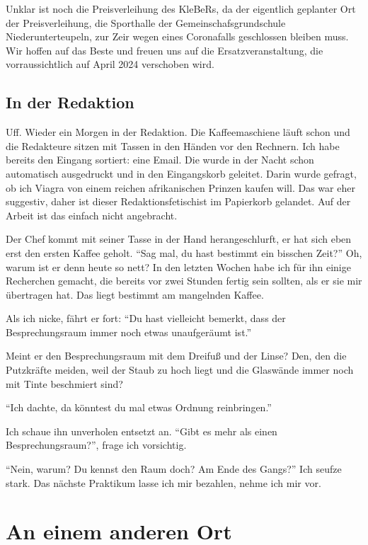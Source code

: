 \documentclass[final]{multiversum}
\begin{document}
Unklar ist noch die Preisverleihung des KleBeRs, da der eigentlich geplanter Ort der Preisverleihung, die Sporthalle der Gemeinschafsgrundschule Niederunterteupeln, zur Zeir wegen eines Coronafalls geschlossen bleiben muss.
Wir hoffen auf das Beste und freuen uns auf die Ersatzveranstaltung, die vorraussichtlich auf April 2024 verschoben wird.

\subsection{In der Redaktion}
Uff. Wieder ein Morgen in der Redaktion.
Die Kaffeemaschiene läuft schon und die Redakteure sitzen mit Tassen in den Händen vor den Rechnern.
Ich habe bereits den Eingang sortiert: eine Email.
Die wurde in der Nacht schon automatisch ausgedruckt und in den Eingangskorb geleitet.
Darin wurde gefragt, ob ich Viagra von einem reichen afrikanischen Prinzen kaufen will.
Das war eher suggestiv, daher ist dieser Redaktionsfetischist im Papierkorb gelandet.
Auf der Arbeit ist das einfach nicht angebracht.

Der Chef kommt mit seiner Tasse in der Hand herangeschlurft, er hat sich eben erst den ersten Kaffee geholt.
\enquote{Sag mal, du hast bestimmt ein bisschen Zeit?}
Oh, warum ist er denn heute so nett?
In den letzten Wochen habe ich für ihn einige Recherchen gemacht, die bereits vor zwei Stunden fertig sein sollten, als er sie mir übertragen hat.
Das liegt bestimmt am mangelnden Kaffee.

Als ich nicke, fährt er fort:
\enquote{Du hast vielleicht bemerkt, dass der Besprechungsraum immer noch etwas unaufgeräumt ist.}

Meint er den Besprechungsraum mit dem Dreifuß und der Linse?
Den, den die Putzkräfte meiden, weil der Staub zu hoch liegt und die Glaswände immer noch mit Tinte beschmiert sind?

 \enquote{Ich dachte, da könntest du mal etwas Ordnung reinbringen.}
 
 Ich schaue ihn unverholen entsetzt an.
 \enquote{Gibt es mehr als einen Besprechungsraum?}, frage ich vorsichtig.

 \enquote{Nein, warum? Du kennst den Raum doch? Am Ende des Gangs?}
 Ich seufze stark.
 Das nächste Praktikum lasse ich mir bezahlen, nehme ich mir vor.


\section{An einem anderen Ort}
\end{document}
